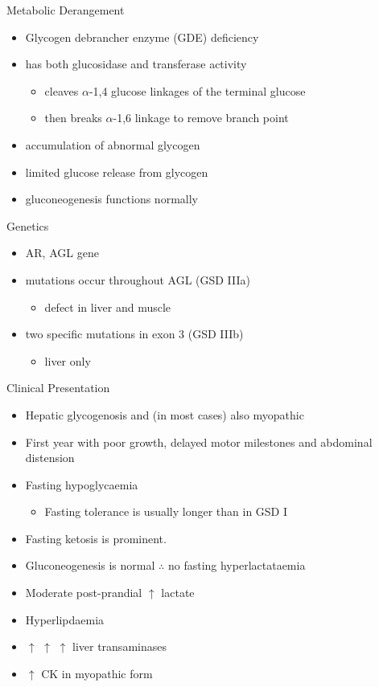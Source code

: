 \documentclass[presentation, smaller]{beamer}
\begin{document}
\begin{frame}[label={sec:orga90f773}]{Metabolic Derangement}
\begin{itemize}
\item Glycogen debrancher enzyme (GDE) deficiency
\item has both glucosidase and transferase activity
\begin{itemize}
\item cleaves \(\alpha\)-1,4 glucose linkages of the terminal glucose
\item then breaks \(\alpha\)-1,6 linkage to remove branch point
\end{itemize}
\item accumulation of abnormal glycogen
\item limited glucose release from glycogen
\item gluconeogenesis functions normally
\end{itemize}
\end{frame}
\begin{frame}[label={sec:orgea0d703}]{Genetics}
\begin{itemize}
\item AR, AGL gene
\item mutations occur throughout AGL (GSD IIIa)
\begin{itemize}
\item defect in liver and muscle
\end{itemize}
\item two specific mutations in exon 3 (GSD IIIb)
\begin{itemize}
\item liver only
\end{itemize}
\end{itemize}
\end{frame}
\begin{frame}[label={sec:orge4354ce}]{Clinical Presentation}
\begin{itemize}
\item Hepatic glycogenosis and (in most cases) also myopathic
\item First year with poor growth, delayed motor milestones and abdominal
distension
\item Fasting hypoglycaemia 
\begin{itemize}
\item Fasting tolerance is usually longer than in GSD I
\end{itemize}
\item Fasting ketosis is prominent.
\item Gluconeogenesis is normal \(\therefore\) no fasting hyperlactataemia
\item Moderate post-prandial \(\uparrow\) lactate
\item Hyperlipdaemia
\item \(\uparrow\) \(\uparrow\) \(\uparrow\) liver transaminases
\item \(\uparrow\) CK in myopathic form
\end{itemize}
\end{frame}
\end{document}
